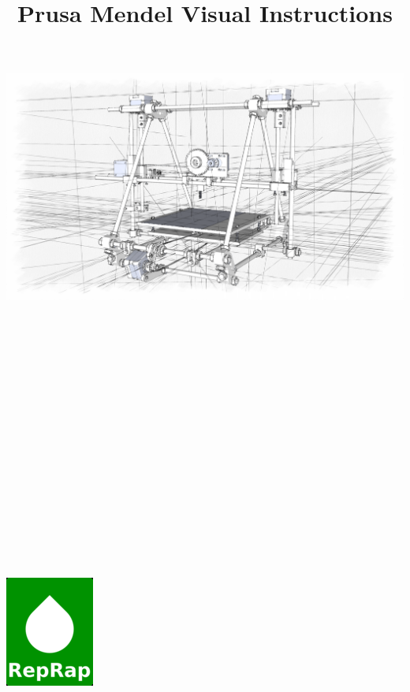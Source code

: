 \documentclass[twoside,a4paper,titlepage]{memoir}
\title{Prusa Mendel Visual Instructions}
\begin{document}
	\setcounter{tocdepth}{0}
	\maketitle
	
	\includegraphics[width=1\linewidth]{graphics/prusa_cover.png}\\ \\ \\ \\ \\
	\\ \\ \\ \\ \\ \\ \\ \\ \\ \\ \\ \\ \\
	\begin{center}
		\includegraphics[scale=0.32]{graphics/reprap_logo.png}
	\end{center}
	
	\pagestyle{reprap}
\end{document}
